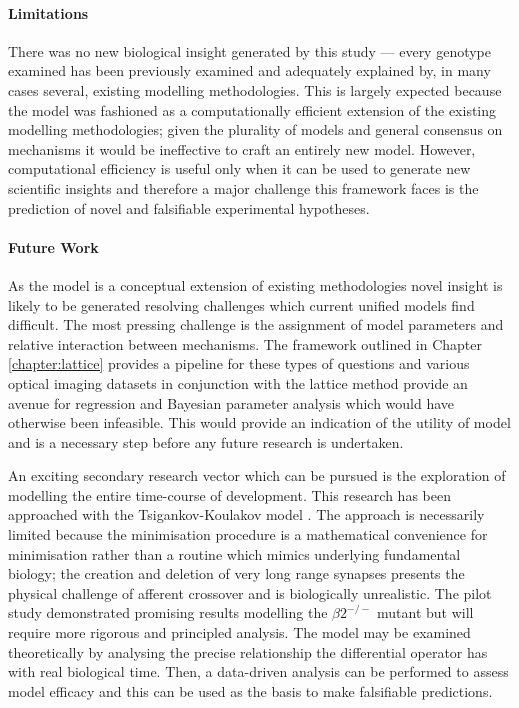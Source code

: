 \paragraph{Limitations}
There was no new biological insight generated by this study --- every genotype examined has been previously examined and adequately explained by, in many cases several, existing modelling methodologies. This is largely expected because the model was fashioned as a computationally efficient extension of the existing modelling methodologies; given the plurality of models and general consensus on mechanisms it would be ineffective to craft an entirely new model. However, computational efficiency is useful only when it can be used to generate new scientific insights and therefore a major challenge this framework faces is the prediction of novel and falsifiable experimental hypotheses.
\paragraph{Future Work}
As the model is a conceptual extension of existing methodologies novel insight is likely to be generated resolving challenges which current unified models find difficult. The most pressing challenge is the assignment of model parameters and relative interaction between mechanisms. The framework outlined in Chapter \ref{chapter:lattice} provides a pipeline for these types of questions and various optical imaging datasets in conjunction with the lattice method provide an avenue for regression and Bayesian parameter analysis which would have otherwise been infeasible. This would provide an indication of the utility of model and is a necessary step before any future research is undertaken.

An exciting secondary research vector which can be pursued is the exploration of modelling the entire time-course of development. This research has been approached with the Tsigankov-Koulakov model \cite{Lyngholm2019-fs}. The approach is necessarily limited because the minimisation procedure is a mathematical convenience for minimisation rather than a routine which mimics underlying fundamental biology; the creation and deletion of very long range synapses presents the physical challenge of afferent crossover and is biologically unrealistic. The pilot study demonstrated promising results modelling the $\beta2^{-/-}$ mutant but will require more rigorous and principled analysis. The model may be examined theoretically by analysing the precise relationship the differential operator has with real biological time. Then, a data-driven analysis can be performed to assess model efficacy and this can be used as the basis to make falsifiable predictions.

